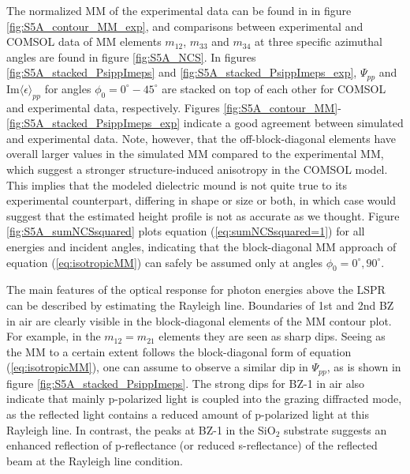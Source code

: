 The normalized MM of the experimental data can be found in in figure \ref{fig:S5A_contour_MM_exp}, and comparisons between experimental and COMSOL data of MM elements $m_{12}$, $m_{33}$ and $m_{34}$ at three specific azimuthal angles are found in figure \ref{fig:S5A_NCS}. In figures \ref{fig:S5A_stacked_PsippImeps} and \ref{fig:S5A_stacked_PsippImeps_exp}, $\Psi_{pp}$ and $\text{Im}\langle\epsilon\rangle_{pp}$ for angles $\phi_0=0^\circ-45^\circ$ are stacked on top of each other for COMSOL and experimental data, respectively. Figures \ref{fig:S5A_contour_MM}-\ref{fig:S5A_stacked_PsippImeps_exp} indicate a good agreement between simulated and experimental data. Note, however, that the off-block-diagonal elements have overall larger values in the simulated MM compared to the experimental MM, which suggest a stronger structure-induced anisotropy in the COMSOL model. This implies that the modeled dielectric mound is not quite true to its experimental counterpart, differing in shape or size or both, in which case would suggest that the estimated height profile is not as accurate as we thought. Figure \ref{fig:S5A_sumNCSsquared} plots equation (\ref{eq:sumNCSsquared=1}) for all energies and incident angles, indicating that the block-diagonal MM approach of equation (\ref{eq:isotropicMM}) can safely be assumed only at angles $\phi_0=0^\circ, 90^\circ$. 

The main features of the optical response for photon energies above the LSPR can be described by estimating the Rayleigh line. Boundaries of 1st and 2nd BZ in air are clearly visible in the block-diagonal elements of the MM contour plot. For example, in the $m_{12}=m_{21}$ elements they are seen as sharp dips. Seeing as the MM to a certain extent follows the block-diagonal form of equation (\ref{eq:isotropicMM}), one can assume to observe a similar dip in $\Psi_{pp}$, as is shown in figure \ref{fig:S5A_stacked_PsippImeps}. The strong dips for BZ-1 in air also indicate that mainly p-polarized light is coupled into the grazing diffracted mode, as the reflected light contains a reduced amount of p-polarized light at this Rayleigh line. In contrast, the peaks at BZ-1 in the SiO$_2$ substrate suggests an enhanced reflection of p-reflectance (or reduced s-reflectance) of the reflected beam at the Rayleigh line condition.

